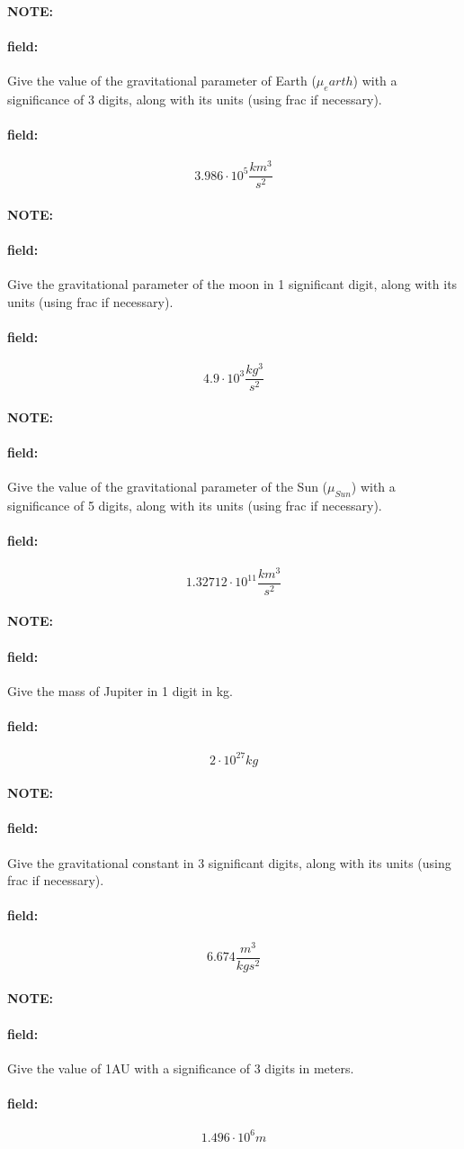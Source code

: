 \documentclass[12pt]{article}
\newenvironment{note}{\paragraph{NOTE:}}{}
\newenvironment{field}{\paragraph{field:}}{}
\begin{document}
\begin{note}
   \begin{field}
       Give the value of the gravitational parameter of Earth (\(\mu_earth\)) with a significance of 3 digits, along with its units (using frac if necessary).
   \end{field}
   \begin{field}
		\[
			3.986\cdot10^5\frac{km^3}{s^2}
		\]
   \end{field}
\end{note}
\begin{note}
   \begin{field}
       Give the gravitational parameter of the moon in 1 significant digit, along with its units (using frac if necessary).
   \end{field}
   \begin{field}
		\[
			4.9\cdot10^{3}\frac{kg^3}{s^2}
		\]
   \end{field}
\end{note}
\begin{note}
   \begin{field}
       Give the value of the gravitational parameter of the Sun (\(\mu_{Sun}\)) with a significance of 5 digits, along with its units (using frac if necessary).
   \end{field}
   \begin{field}
		\[
			1.32712\cdot10^{11}\frac{km^3}{s^2}
		\]
   \end{field}
\end{note}

\begin{note}
   \begin{field}
       Give the mass of Jupiter in 1 digit in kg.
   \end{field}
   \begin{field}
		\[
			2\cdot10^{27}kg
		\]
   \end{field}
\end{note}

\begin{note}
   \begin{field}
       Give the gravitational constant in 3 significant digits, along with its units (using frac if necessary).
   \end{field}
   \begin{field}
		\[
			6.674\frac{m^3}{kg s^2}
		\]
   \end{field}
\end{note}

\begin{note}
   \begin{field}
       Give the value of 1AU with a significance of 3 digits in meters.
   \end{field}
   \begin{field}
		\[
			1.496\cdot10^6m
		\]
   \end{field}
\end{note}
\end{document}
